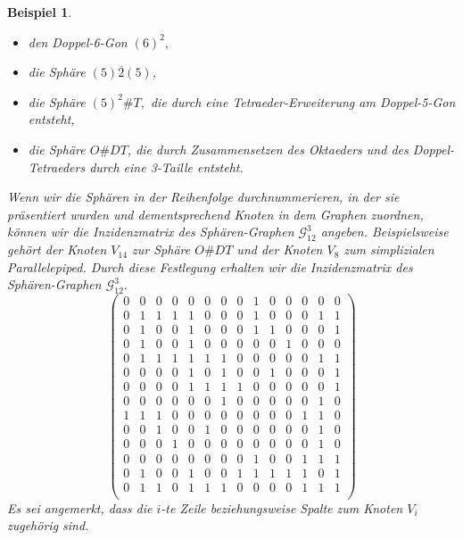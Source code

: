 \documentclass[12pt,titlepage,twoside,cleardoublepage]{article}
\theoremstyle{nummermitklammern}
\newtheorem{bsp}[temp]{Beispiel}
\newtheorem{bsp}[zahl]{Beispiel}
\numberwithin{equation}{section}
\begin{document}
\begin{bsp}
\begin{itemize}
\begin{itemize}
 \item den Doppel-6-Gon $(6)^2,$
 \item die Sphäre $(5)\overline{2}(5)$,
 \item die Sphäre $(5)^2\#T,$ die durch eine Tetraeder-Erweiterung am Doppel-5-Gon entsteht,
 \item die Sphäre $O\# DT$, die durch Zusammensetzen des Oktaeders und des Doppel-Tetraeders durch eine 3-Taille entsteht.
 \end{itemize}
 Wenn wir die Sphären in der Reihenfolge durchnummerieren, in der sie präsentiert wurden und dementsprechend Knoten in dem Graphen zuordnen, können wir die Inzidenzmatrix des  Sphären-Graphen $\mathcal{G}^3_{12}$ angeben. Beispielsweise gehört der Knoten $V_{14}$ zur Sphäre $O\#DT$ und der Knoten $V_8$ zum simplizialen Parallelepiped. Durch diese Festlegung erhalten wir die Inzidenzmatrix des Sphären-Graphen $\mathcal{G}^3_{12}.$
 \[
\left( \begin{array}{rrrrrrrrrrrrrr}
 0&0&0&0&0&0&0&0&1&0&0&0&0&0\\
 0& 1& 1& 1& 1& 0& 0& 0& 1& 0& 0& 0& 1& 1\\
 0& 1& 0& 0& 1& 0& 0& 0& 1& 1& 0& 0& 0& 1\\
 0& 1& 0& 0& 1& 0& 0& 0& 0& 0& 1& 0& 0& 0 \\
 0& 1& 1& 1& 1& 1& 1& 0& 0& 0& 0& 0& 1& 1 \\
 0& 0& 0& 0& 1& 0& 1& 0& 0& 1& 0& 0& 0& 1\\
 0& 0& 0& 0& 1& 1& 1& 1& 0& 0& 0& 0& 0& 1\\
 0& 0& 0& 0& 0& 0& 1& 0& 0& 0& 0& 0& 1& 0\\
 1& 1& 1& 0& 0& 0& 0& 0& 0& 0& 0& 1& 1& 0\\
 0& 0& 1& 0& 0& 1& 0& 0& 0& 0& 0& 0& 1& 0\\
 0& 0& 0& 1& 0& 0& 0& 0& 0& 0& 0& 0& 1& 0\\
 0& 0& 0& 0& 0& 0& 0& 0& 1& 0& 0& 1& 1& 1\\
 0& 1& 0& 0& 1& 0& 0& 1& 1& 1& 1& 1& 0& 1 \\
 0& 1& 1& 0& 1& 1& 1& 0& 0& 0& 0& 1& 1& 1 \\
\end{array}
\right)
 \]
 Es sei angemerkt, dass die $i$-te Zeile beziehungsweise Spalte zum Knoten $V_i$ zugehörig sind.
 \end{itemize}
 \end{bsp}
\end{document}
